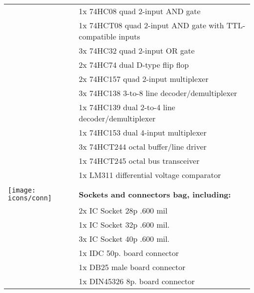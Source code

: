 \begin{longtable}{m{10mm}|l}
	                                      & 1x 74HC08 quad 2-input AND gate                             \\
	                                      & 1x 74HCT08 quad 2-input AND gate with TTL-compatible inputs \\
	                                      & 3x 74HC32 quad 2-input OR gate                              \\
	                                      & 2x 74HC74 dual D-type flip flop                             \\
	                                      & 2x 74HC157 quad 2-input multiplexer                         \\
	                                      & 3x 74HC138 3-to-8 line decoder/demultiplexer                \\
	                                      & 1x 74HC139 dual 2-to-4 line decoder/demultiplexer           \\
	                                      & 1x 74HC153 dual 4-input multiplexer                         \\
	                                      & 3x 74HCT244 octal buffer/line driver                        \\
	                                      & 1x 74HCT245 octal bus transceiver                           \\
	                                      & 1x LM311 differential voltage comparator                    \\
	                                      &                                                             \\
	\texttt{[image: icons/conn]}          & {\bf Sockets and connectors bag, including:}                \\
	                                      & 2x IC Socket 28p .600 mil                                   \\
	                                      & 1x IC Socket 32p .600 mil.                                  \\
	                                      & 3x IC Socket 40p .600 mil.                                  \\
	                                      & 1x IDC 50p. board connector                                 \\
	                                      & 1x DB25 male board connector                                \\
	                                      & 1x DIN45326 8p. board connector                             \\

\end{longtable}
